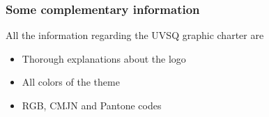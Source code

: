 \documentclass[10pt,hidelinks]{beamer}
\newcommand{\backupend}{
   \addtocounter{framenumberappendix}{-\value{framenumber}}
   \addtocounter{framenumber}{\value{framenumberappendix}} 
}
\newcommand{\colorhref}[2]{\href{#1}{\color{bleublason}{#2}}}
\begin{document}
\begin{frame}
  \frametitle{Some complementary information}
  
  All the information regarding the UVSQ graphic charter are \colorhref{http://www.uvsq.fr/jsp/saisie/liste_fichiergw.jsp?OBJET=DOCUMENT&CODE=1429111529765&LANGUE=0}{available here}

  \begin{itemize}
  \item Thorough explanations about the logo
  \item All colors of the theme
  \item RGB, CMJN and Pantone codes
  \end{itemize}

  \vfill

  \begin{flushright}
    \hyperlink{compinfhome}{}
    \hypertarget{compinf}{}
  \end{flushright}

\end{frame}
\backupend
\end{document}
